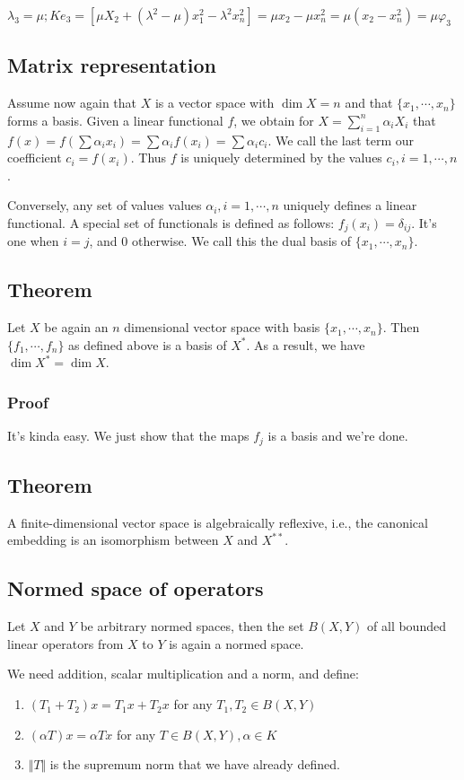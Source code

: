 \documentclass[11pt]{article}
\begin{document}
\(\lambda_3 = \mu; Ke_3 = [\mu X_2 + (\lambda^2 - \mu)x_1^2 - \lambda^2 x_n^2]
   = \mu x_2 - \mu x_n^2 = \mu(x_2 - x_n^2) = \mu \varphi_3\)
\subsection{Matrix representation}
\label{sec:org57643ec}
Assume now again that \(X\) is a vector space with \(\dim X = n\) and that
\(\{x_1, \cdots, x_n\}\) forms a basis. Given a linear functional \(f\), we
obtain for \(X = \sum_{i=1}^{n} \alpha_i X_i\) that \(f(x) = f(\sum \alpha_i
   x_i) = \sum \alpha_i f(x_i) = \sum\alpha_ic_i\). We call the last term our
coefficient \(c_i = f(x_i)\). Thus \(f\) is uniquely determined by the values
\(c_i, i=1, \cdots, n\).

Conversely, any set of values values \(\alpha_i, i =1, \cdots, n\) uniquely
defines a linear functional. A special set of functionals is defined as
follows: \(f_j(x_i) = \delta_{ij}\). It's one when \(i=j\), and \(0\) otherwise. We
call this the dual basis of \(\{x_1, \cdots, x_n\}\).
\subsection{Theorem}
\label{sec:org56d8402}
Let \(X\) be again an \(n\) dimensional vector space with basis \(\{x_1, \cdots,
   x_n\}\). Then \(\{f_1, \cdots, f_n\}\) as defined above is a basis of \(X^{*}\).
As a result, we have \(\dim X^{*} = \dim X\).
\subsubsection{Proof}
\label{sec:orgc94f85c}
It's kinda easy. We just show that the maps \(f_j\) is a basis and we're done.
\subsection{Theorem}
\label{sec:orgc106408}
A finite-dimensional vector space is algebraically reflexive, i.e., the
canonical embedding is an isomorphism between \(X\) and \(X^{**}\).
\subsection{Normed space of operators}
\label{sec:org0ba0054}
Let \(X\) and \(Y\) be arbitrary normed spaces, then the set \(B(X, Y)\) of all
bounded linear operators from \(X\) to \(Y\) is again a normed space.

We need addition, scalar multiplication and a norm, and define:
\begin{enumerate}
\item \((T_1 + T_2)x = T_1 x + T_2x\) for any \(T_1, T_2 \in B(X, Y)\)
\item \((\alpha T) x = \alpha Tx\) for any \(T\in B(X, Y), \alpha \in K\)
\item \(\Vert T\Vert\) is the supremum norm that we have already defined.
\end{enumerate}
\end{document}
